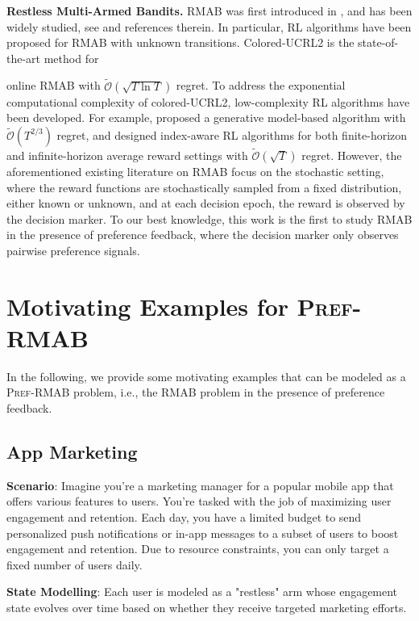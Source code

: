 \documentclass{article} %
\newcommand{\RMABPF}{\textsc{Pref-RMAB}\xspace}
\begin{document}
\textbf{Restless Multi-Armed Bandits.}
RMAB was first introduced in \cite{whittle1988restless}, and has been widely studied, see \cite{xiong2022Nips} and references therein. In particular, RL algorithms have been proposed for RMAB with unknown transitions. Colored-UCRL2 is the state-of-the-art method for {online RMAB with $\tilde{\mathcal{O}}(\sqrt{T\ln T})$ regret. To address the exponential computational complexity of colored-UCRL2, low-complexity RL algorithms have been developed. For example, \cite{wang2020restless} proposed a generative model-based algorithm with $\tilde{\mathcal{O}}(T^{2/3})$ regret, and \cite{xiong2022reinforcement,xiong2022Nips} designed index-aware RL algorithms for both finite-horizon and infinite-horizon average reward settings with $\tilde{\mathcal{O}}(\sqrt{T})$ regret. However, the aforementioned existing literature on RMAB focus on the stochastic setting, where the reward functions are stochastically sampled from a fixed distribution, either known or unknown, and at each decision epoch, the reward is observed by the decision marker. To our best knowledge, this work is the first to study RMAB in the presence of preference feedback, where the decision marker only observes pairwise preference signals. 


\section{Motivating Examples for \RMABPF}\label{sec:examples-app}


In the following, we provide some motivating examples that can be modeled as a \RMABPF problem, i.e., the RMAB problem in the presence of preference feedback. 

\subsection{App Marketing} \label{sec:App_marketing_description}

\textbf{Scenario}: Imagine you're a marketing manager for a popular mobile app that offers various features to users. You're tasked with the job of maximizing user engagement and retention. Each day, you have a limited budget to send personalized push notifications or in-app messages to a subset of users to boost engagement and retention. Due to resource constraints, you can only target a fixed number of users daily.


\textbf{State Modelling}: Each user is modeled as a "restless" arm whose engagement state evolves over time based on whether they receive targeted marketing efforts.

}
\end{document}
